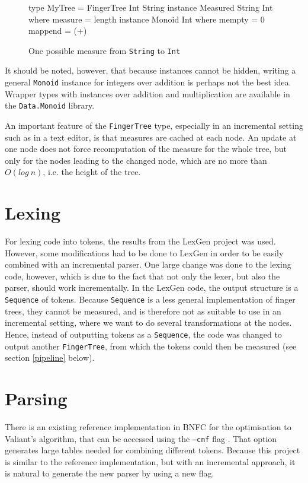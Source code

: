 \documentclass[a4paper,12pt,notitlepage]{report}
\renewcommand\cite{\citep}
\begin{document}
\begin{figure}[H]
\begin{code}
type MyTree = FingerTree Int String
instance Measured String Int where
    measure = length
instance Monoid Int where
    mempty = 0
    mappend = (+)
\end{code}
\caption{One possible measure from \texttt{String} to \texttt{Int}}
\end{figure}
It should be noted, however, that because instances cannot be hidden, writing a
general \texttt{Monoid} instance for integers over addition is perhaps not the
best idea. Wrapper types with instances over addition and multiplication are
available in the \texttt{Data.Monoid} library. 

An important feature of the \texttt{FingerTree} type, especially in an incremental
setting such as in a text editor, is that measures are cached at each node. An
update at one node does not force recomputation of the measure for the whole
tree, but only for the nodes leading to the changed node, which are no more than
$O(log\ n)$, i.e. the height of the tree. 

\section{Lexing}
For lexing code into tokens, the results from the LexGen project was used.
However, some modifications had to be done to LexGen in order to be easily
combined with an incremental parser. One large change was done to the lexing
code, however, which is due to the fact that not only the lexer, but also the
parser, should work incrementally. In the LexGen code, the output structure is a
\texttt{Sequence} of tokens. Because \texttt{Sequence} is a less general
implementation of finger trees, they cannot be measured, and is therefore not as
suitable to use in an incremental setting, where we want to do several
transformations at the nodes. Hence, instead of outputting tokens
as a \texttt{Sequence}, the code was changed to output another
\texttt{FingerTree}, from which the tokens could then be measured (see section
\ref{pipeline} below).

\section{Parsing}
There is an existing reference implementation in BNFC for the optimisation to
Valiant's algorithm, that can be accessed using the \texttt{---cnf} flag
\cite{parparsepaper}. That option generates large tables needed for combining
different tokens. Because this project is similar to the reference
implementation, but with an incremental approach, it is natural to generate the
new parser by using a new flag.
\end{document}
